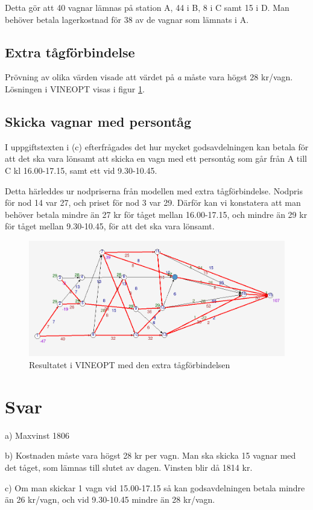 \documentclass[a4paper,titlepage,12pt]{article}
\begin{document}
Detta gör att 40 vagnar lämnas på station A, 44 i B, 8 i C samt 15 i D. Man
behöver betala lagerkostnad för 38 av de vagnar som lämnats i A.

\subsection*{Extra tågförbindelse}
Prövning av olika värden visade att värdet på \textit{a} måste vara högst 28
kr/vagn. Lösningen i VINEOPT visas i figur \ref{resfig2}.

\subsection*{Skicka vagnar med persontåg}
I uppgiftstexten i (c) efterfrågades det hur mycket godsavdelningen kan betala
för att det ska vara lönsamt att skicka en vagn med ett persontåg som går från
A till C kl 16.00-17.15, samt ett vid 9.30-10.45.

Detta härleddes ur nodpriserna från modellen med extra tågförbindelse.
Nodpris för nod 14 var 27, och priset för nod 3 var 29. Därför kan vi
konstatera att man behöver betala mindre än 27 kr för tåget mellan
16.00-17.15, och mindre än 29 kr för tåget mellan 9.30-10.45, för att det ska
vara lönsamt.

\begin{figure}[h]
    \begin{centering}
        \includegraphics[width=15cm]{res2.png}
        \caption{Resultatet i VINEOPT med den extra tågförbindelsen\label{resfig2}}
    \end{centering}
\end{figure}

\newpage
\section*{Svar}

a) Maxvinst 1806

b) Kostnaden måste vara högst 28 kr per vagn. Man ska skicka 15 vagnar
med det tåget, som lämnas till slutet av dagen. Vinsten blir då 1814 kr.

c) Om man skickar 1 vagn vid 15.00-17.15 så kan godsavdelningen betala mindre än 26
kr/vagn, och vid 9.30-10.45 mindre än 28 kr/vagn.
\end{document}

